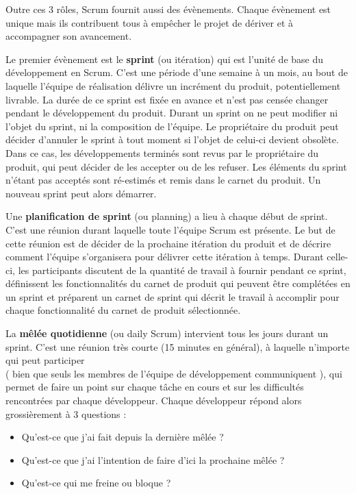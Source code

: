 \documentclass[12pt]{report}
\begin{document}
Outre ces 3 rôles, Scrum fournit aussi des évènements. Chaque évènement est unique mais ils contribuent tous à empêcher le projet de dériver et à accompagner son avancement.

Le premier évènement est le \textbf{sprint} (ou itération) qui est l'unité de base du développement en Scrum. C'est une période d'une semaine à un mois, au bout de laquelle l'équipe de réalisation délivre un incrément du produit, potentiellement livrable. La durée de ce sprint est fixée en avance et n'est pas censée changer pendant le développement du produit. Durant un sprint on ne peut modifier ni l'objet du sprint, ni la composition de l'équipe. Le propriétaire du produit peut décider d'annuler le sprint à tout moment si l'objet de celui-ci devient obsolète. Dans ce cas, les développements terminés sont revus par le propriétaire du produit, qui peut décider de les accepter ou de les refuser. Les éléments du sprint n'étant pas acceptés sont ré-estimés et remis dans le carnet du produit. Un nouveau sprint peut alors démarrer\cite{wikiscrum}.

Une \textbf{planification de sprint} (ou planning) a lieu à chaque début de sprint. C'est une réunion durant laquelle toute l'équipe Scrum est présente. Le but de cette réunion est de décider de la prochaine itération du produit et de décrire comment l'équipe s'organisera pour délivrer cette itération à temps. Durant celle-ci, les participants discutent de la quantité de travail à fournir pendant ce sprint, définissent les fonctionnalités du carnet de produit qui peuvent être complétées en un sprint et préparent un carnet de sprint qui décrit le travail à accomplir pour chaque fonctionnalité du carnet de produit sélectionnée.

La \textbf{mêlée quotidienne} (ou daily Scrum) intervient tous les jours durant un sprint. C'est une réunion très courte (15 minutes en général), à laquelle n'importe qui peut participer ~~\\ ( bien que seuls les membres de l'équipe de développement communiquent ), qui permet de faire un point sur chaque tâche en cours et sur les difficultés rencontrées par chaque développeur.
Chaque développeur répond alors grossièrement à 3 questions :
\begin{itemize}
\item Qu'est-ce que j'ai fait depuis la dernière mêlée ?
\item Qu'est-ce que j'ai l'intention de faire d'ici la prochaine mêlée ?
\item Qu'est-ce qui me freine ou bloque\cite{wikiscrum} ?
\end{itemize}
\end{document}
